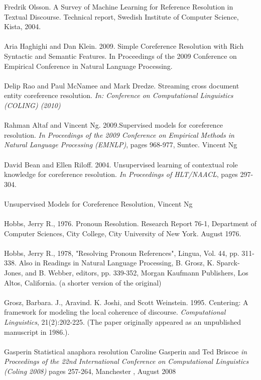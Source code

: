 \big[40\big] Fredrik Olsson. A Survey of Machine Learning for Reference Resolution in Textual Discourse. Technical report, Swedish Institute of Computer Science, Kista, 2004.\\  \\
\big[41\big] Aria Haghighi and Dan Klein. 2009. Simple Coreference Resolution with Rich Syntactic and Semantic Features. In Proceedings of the 2009 Conference on Empirical Conference in Natural Language Processing.\\  \\
\big[42\big] Delip Rao and Paul McNamee and Mark Dredze. Streaming cross document entity coreference resolution. \emph{In: Conference on Computational Linguistics (COLING) (2010)} \\  \\
\big[43\big] Rahman Altaf and Vincent Ng. 2009.Supervised models for coreference resolution. \emph{ In Proceedings of the 2009 Conference on Empirical Methods in Natural Language Processing (EMNLP)}, pages 968-977, Suntec. Vincent Ng \\  \\
\big[44\big] David Bean and Ellen Riloff. 2004. Unsupervised learning of contextual role knowledge for coreference resolution. \emph{ In Proceedings  of HLT/NAACL}, pages 297-304. \\  \\
\big[45\big] Unsupervised Models for Coreference Resolution, Vincent Ng \\  \\
\big[46\big] Hobbs, Jerry R., 1976. Pronoun Resolution.  Research Report 76-1, Department of Computer Sciences, City College, City University of New York. August 1976.  \\  \\
\big[47\big] Hobbs, Jerry R., 1978, "Resolving Pronoun References", Lingua, Vol.  44, pp. 311-338.  Also in Readings in Natural Language Processing, B. Grosz, K. Sparck-Jones, and B. Webber, editors, pp. 339-352, Morgan Kaufmann Publishers, Los Altos, California. (a shorter version of the original) \\  \\
\big[48\big] Grosz, Barbara. J., Aravind. K. Joshi, and Scott Weinstein. 1995. Centering: A framework for modeling the local coherence of discourse. \emph{Computational Linguistics}, 21(2):202-225. (The paper originally appeared as an unpublished manuscript in 1986.). \\  \\
\big[49\big] Gasperin Statistical anaphora resolution Caroline Gasperin and Ted Briscoe \emph{in Proceedings of the 22nd International Conference on Computational Linguistics (Coling 2008)} pages 257-264, Manchester , August 2008 \\  \\ 
